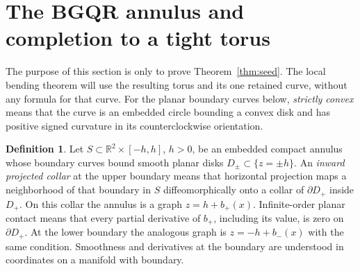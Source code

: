 \documentclass[11pt]{amsart}
\theoremstyle{definition}
\newtheorem{definition}[theorem]{Definition}
\newcommand{\R}{\mathbb R}
\begin{document}
\section{The BGQR annulus and completion to a tight torus}
\label{sec:seed}

The purpose of this section is only to prove Theorem~\ref{thm:seed}.
The local bending theorem will use the resulting torus and its one
retained curve, without any formula for that curve.
For the planar boundary curves below, \emph{strictly convex} means
that the curve is an embedded circle bounding a convex disk and
has positive signed curvature in its counterclockwise orientation.

\begin{definition}\label{def:planar-jets}
Let $S\subset\R^2\times[-h,h]$, $h>0$, be an embedded compact
annulus whose boundary curves bound smooth planar disks
$D_\pm\subset\{z=\pm h\}$. An \emph{inward projected collar} at the
upper boundary means that horizontal projection maps a neighborhood
of that boundary in $S$ diffeomorphically onto a collar of
$\partial D_+$ inside $D_+$. On this collar the annulus is a graph
$z=h+b_+(x)$. Infinite-order planar contact means that every partial
derivative of $b_+$, including its value, is zero on $\partial D_+$.
At the lower boundary the analogous graph is $z=-h+b_-(x)$ with
the same condition. Smoothness and derivatives at the boundary
are understood in coordinates on a manifold with boundary.
\end{definition}
\end{document}

